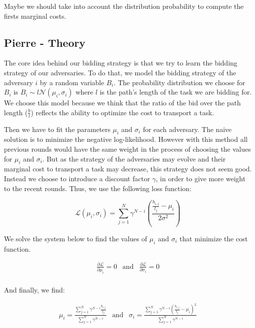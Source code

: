 \documentclass[11pt]{article}
\begin{document}
Maybe we should take into account the distribution probability to compute the firsts marginal costs.

\subsection{Pierre - Theory}

The core idea behind our bidding strategy is that we try to learn the bidding strategy of our adversaries. To do that, we model the bidding strategy of the adversary $i$ by a random variable $B_i$. The probability distribution we choose for $B_i$ is $B_i \sim l\mathcal{N}(\mu_i, \sigma_i)$ where $l$ is the path's length of the task we are bidding for. We choose this model because we think that the ratio of the bid over the path length ($\frac{b}{l}$) reflects the ability to optimize the cost to transport a task.

Then we have to fit the parameters $\mu_i$ and $\sigma_i$ for each adversary. The naive solution is to minimize the negative log-likelihood. However with this method all previous rounds would have the same weight in the process of choosing the values for $\mu_i$ and $\sigma_i$. But as the strategy of the adversaries may evolve and their marginal cost to transport a task may decrease, this strategy does not seem good. Instead we choose to introduce a discount factor $\gamma$, in order to give more weight to the recent rounds. Thus, we use the following loss function:

$$
\mathcal{L}(\mu_i, \sigma_i) = \sum_{j=1}^{N}{\gamma^{N-i}\left(\frac{\frac{b_{i,j}}{l_j} - \mu_i}{2\sigma^2}\right)}
$$

We solve the system below to find the values of $\mu_i$ and $\sigma_i$ that minimize the cost function.

$$
\begin{array}{ccc}
\frac{\partial \mathcal{L}}{\partial \mu_i} = 0 & 
\text{and} &
\frac{\partial \mathcal{L}}{\partial \sigma_i} = 0 \\
\end{array}
$$

And finally, we find:

$$
\begin{array}{ccc}
\mu_i = \frac{\sum_{j = 1}^{N}{\gamma^{N-i}\frac{b_{i,j}}{l_j}}}{\sum_{j = 1}^{N}{\gamma^{N-i}}} &
\text{and} &
\sigma_i = \frac{\sum_{j = 1}^{N}{\gamma^{N-i}\left(\frac{b_{i,j}}{l_j}-\mu_i\right)^2}}{\sum_{j = 1}^{N}{\gamma^{N-i}}} \\
\end{array}
$$
\end{document}
